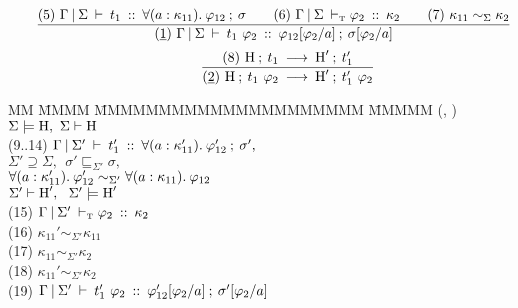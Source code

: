 \begin{flushleft}
\bigskip
\bigskip
$$ 
\qquad 
	\frac
	{ (5) \ \Gamma \: \arrowvert \: \Sigma \: \vdash \: t_1 \: :: \: \forall(a : \kappa_{11}). \: \varphi_{12} \: ; \: \sigma
	  \qquad
	  (6) \ \Gamma \: \arrowvert \: \Sigma \: \vdash_\textrm{\tiny{T}}\varphi_2 \: :: \: \kappa_{2} 
	  \qquad
	  (7) \ \kappa_{11} \sim_\Sigma \kappa_2
	}
	{ (\underline{1}) \ \Gamma \: \arrowvert \: \Sigma \: \vdash \: t_1 \ \varphi_2 \: :: \: \varphi_{12}[\varphi_2/a] \: ; \: \sigma[\varphi_2/a]
	}
$$
$$
\qq \qq
	\frac
	{ (8) \ \trEval {\heap} {t_1} {\heap'} {t_1'} }
	{ (\un{2}) \ \trEval {\heap} {t_1 \ \varphi_2} {\heap'} {t_1' \ \varphi_2} }
$$
\begin{tabbing}
MM \= MMMM \= MMMMMMMMMMMMMMMMMMMMM \= MMMMM  \kill
\>	(, ) 	
		\> $\Sigma \models \textrm{H}, \ \Sigma \vdash \textrm{H}$
		\> 
\\[1ex]
\>	(9..14) \> $\Gamma \: \arrowvert \: \Sigma' \: \vdash \: t_1' \: :: \:  \forall(a : \kappa_{11}'). \: \varphi_{12}' \: ; \: \sigma',$ 
\\[0.2ex]
\>		\> \qq $\Sigma' \supseteq \Sigma, \ \
				\sigma' \sqsubseteq_{\Sigma'} \sigma,$
\\[0.2ex]
\>		\> \qq	$\forall(a : \kappa_{11}'). \: \varphi_{12}'
					\sim_{\Sigma'} \forall(a : \kappa_{11}). \: \varphi_{12}$ 
\\[0.2ex]
\>		\> \qq	$\Sigma' \vdash \textrm{H}', \ \
				\Sigma' \models \textrm{H}'$
		\> 
\\[1ex]
\>	(15)	\> $\Gamma \: \arrowvert \: \Sigma' \: \vdash_\textrm{\tiny{T}}\varphi_2 \: :: \: \kappa_2$	
		\> 
\\[1ex]
\>	(16)	\> $\kappa_{11}' \sim_{\Sigma'} \kappa_{11}$		
		\> 
\\[1ex]
\>	(17)	\> $\kappa_{11}  \sim_{\Sigma'} \kappa_{2}$		
		\> 
\\[1ex]
\>	(18)	\> $\kappa_{11}' \sim_{\Sigma'} \kappa_{2}$		
		\> 
\\[1ex]
\>	(19)	\> $\tyJudge {\Gamma} {\Sigma'} {t_1' \ \varphi_2} 
				{\varphi_{12}'[\varphi_2/a]} 
				{\sigma'[\varphi_2/a]}$
		\> 
\end{tabbing}
\bigskip


\end{flushleft}
